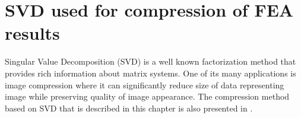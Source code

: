 \chapter{SVD used for compression of FEA results}
\label{chapter:SVD}

Singular Value Decomposition (SVD) is a well known factorization method that provides rich information about matrix systems. One of its many applications is image compression where it can significantly reduce size of data representing image while preserving quality of image appearance. The compression method based on SVD that is described in this chapter is also presented in \cite{Benes2017}.




